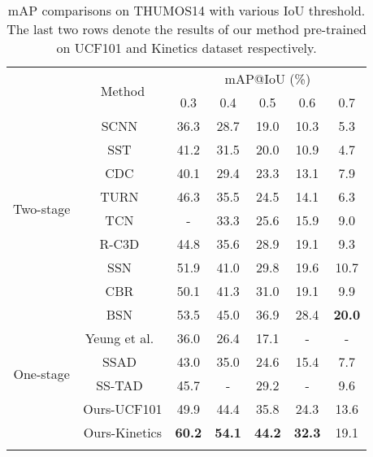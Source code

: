 \documentclass{article}
\begin{document}
\begin{table}[t]
\centering
\caption{mAP comparisons on THUMOS14 with various IoU threshold. The last two rows denote the results of our method pre-trained on UCF101 and Kinetics dataset respectively.} 
\label{tab:results}
\begin{adjustbox}{width=0.48\textwidth}
\small
\begin{tabular}{ c|c|c c c c c } 
\Xhline{2\arrayrulewidth}
\multirow{2}{*}{Stage} & \multirow{2}{*}{Method} & \multicolumn{5}{c}{mAP@IoU (\%)} \\ 
& & 0.3 & 0.4 & 0.5 & 0.6 & 0.7 \\
\hline
\multirow{8}{*}{Two-stage} 
& SCNN~\cite{shou2016temporal} & 36.3 & 28.7 & 19.0 & 10.3 & 5.3 \\ 
& SST~\cite{buch2017sst} & 41.2 & 31.5 & 20.0 & 10.9 & 4.7 \\ 
& CDC~\cite{shou2017cdc} & 40.1 & 29.4 & 23.3 & 13.1 & 7.9 \\ 
& TURN~\cite{Gao_2017_ICCV} & 46.3 & 35.5 & 24.5 & 14.1 & 6.3 \\ 
& TCN~\cite{dai2017temporal} & - & 33.3 & 25.6 & 15.9 & 9.0 \\ 
& R-C3D~\cite{xu2017r} & 44.8 & 35.6 & 28.9 & 19.1 & 9.3 \\ 
& SSN~\cite{zhao2017temporal} & 51.9 & 41.0 & 29.8 & 19.6 & 10.7 \\ 
& CBR~\cite{gao2017cascaded} & 50.1 & 41.3 & 31.0 & 19.1 & 9.9 \\ 
& BSN~\cite{lin2018bsn} & 53.5 & 45.0 & 36.9 & 28.4 & \textbf{20.0} \\ 
\hline
\multirow{4}{*}{One-stage} 
& Yeung et al.~\cite{yeung2016end} & 36.0 & 26.4 & 17.1 & - & - \\ 
& SSAD~\cite{lin2017single} & 43.0 & 35.0 & 24.6 & 15.4 & 7.7 \\ 
& SS-TAD~\cite{sstad_buch_bmvc17} & 45.7 & - & 29.2 & - & 9.6 \\ \cline{2-7}
& Ours-UCF101 & 49.9 & 44.4 & 35.8 & 24.3 & 13.6 \\ 
& Ours-Kinetics & \textbf{60.2} & \textbf{54.1} & \textbf{44.2} & \textbf{32.3} & 19.1 \\ \Xhline{2\arrayrulewidth}
\end{tabular}
\end{adjustbox}
\end{table} 
\end{document}
